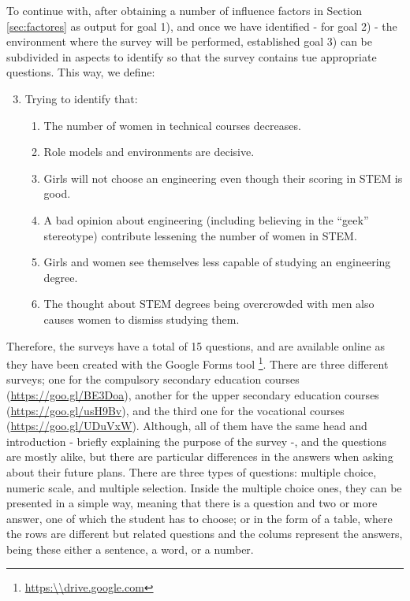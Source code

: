 \documentclass[journal,transmag]{IEEEtran}
\begin{document}
To continue with, after obtaining a number of influence factors in Section \ref{sec:factores} as output for goal 1), and once we have identified - for goal 2) - the environment where the survey will be performed, established goal 3) can be subdivided in aspects to identify so that the survey contains tue appropriate questions. This way, we define:

\begin{enumerate}
  \setcounter{enumi}{2}
  \item Trying to identify that:
  \begin{enumerate}
  \item The number of women in technical courses decreases.
  \item Role models and environments are decisive.
  \item Girls will not choose an engineering even though their scoring in STEM is good.
  \item A bad opinion about engineering (including believing in the ``geek'' stereotype) contribute lessening the number of women in STEM.
  \item Girls and women see themselves less capable of studying an engineering degree.
  \item The thought about STEM degrees being overcrowded with men also causes women to dismiss studying them.
  \end{enumerate}
\end{enumerate}

Therefore, the surveys have a total of 15 questions, and are available online as they have been created with the Google Forms tool \footnote{\url{https:\\drive.google.com}}. There are three different surveys; one for the compulsory secondary education courses (\url{https://goo.gl/BE3Doa}), another for the upper secondary education courses (\url{https://goo.gl/usH9Bv}), and the third one for the vocational courses (\url{https://goo.gl/UDuVxW}). Although, all of them have the same head and introduction - briefly explaining the purpose of the survey -\cite{cohen2013research}, and the questions are mostly alike, but there are particular differences in the answers when asking about their future plans. There are three types of questions: multiple choice, numeric scale, and multiple selection. Inside the multiple choice ones, they can be presented in a simple way, meaning that there is a question and two or more answer, one of which the student has to choose; or in the form of a table, where the rows are different but related questions and the colums represent the answers, being these either a sentence, a word, or a number.
\end{document}
